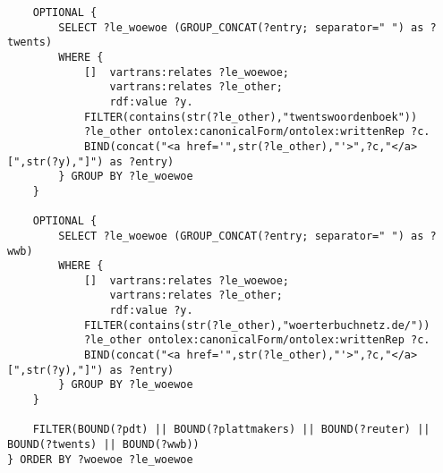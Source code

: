 {\begin{verbatim}
	OPTIONAL { 
		SELECT ?le_woewoe (GROUP_CONCAT(?entry; separator=" ") as ?twents)
		WHERE {
			[] 	vartrans:relates ?le_woewoe;
				vartrans:relates ?le_other;
				rdf:value ?y.
			FILTER(contains(str(?le_other),"twentswoordenboek"))
			?le_other ontolex:canonicalForm/ontolex:writtenRep ?c.
            BIND(concat("<a href='",str(?le_other),"'>",?c,"</a> [",str(?y),"]") as ?entry)
		} GROUP BY ?le_woewoe 
	}

	OPTIONAL { 
		SELECT ?le_woewoe (GROUP_CONCAT(?entry; separator=" ") as ?wwb)
		WHERE {
			[] 	vartrans:relates ?le_woewoe;
				vartrans:relates ?le_other;
				rdf:value ?y.
			FILTER(contains(str(?le_other),"woerterbuchnetz.de/"))
			?le_other ontolex:canonicalForm/ontolex:writtenRep ?c.
            BIND(concat("<a href='",str(?le_other),"'>",?c,"</a> [",str(?y),"]") as ?entry)
		} GROUP BY ?le_woewoe 
	}

	FILTER(BOUND(?pdt) || BOUND(?plattmakers) || BOUND(?reuter) || BOUND(?twents) || BOUND(?wwb))
} ORDER BY ?woewoe ?le_woewoe
\end{verbatim}
} %